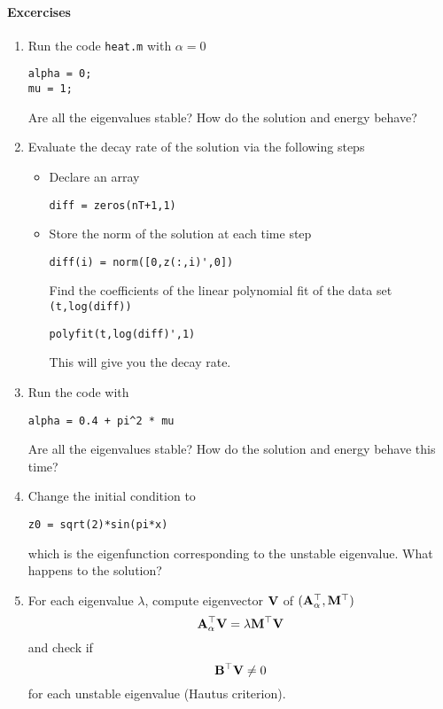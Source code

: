 \documentclass[12pt]{article}
\begin{document}
\paragraph{Excercises}
\begin{enumerate}
\item Run the code {\tt heat.m} with $\alpha =0$
\begin{lstlisting}
alpha = 0; 
mu = 1;
\end{lstlisting}
Are all the eigenvalues stable? How do the solution and energy behave?
\item Evaluate the decay rate of the solution via the following steps
\begin{itemize}

\item Declare an array 
\begin{lstlisting}
diff = zeros(nT+1,1)
\end{lstlisting}

\item Store the norm of the solution at each time step 
\begin{lstlisting}
diff(i) = norm([0,z(:,i)',0])
\end{lstlisting}
Find the coefficients of the linear polynomial fit of the data set {\tt (t,log(diff))}
\begin{lstlisting}
polyfit(t,log(diff)',1)
\end{lstlisting}
This will give you the decay rate.
\end{itemize}      
\item Run the code with
\begin{lstlisting}
alpha = 0.4 + pi^2 * mu
\end{lstlisting}
Are all the eigenvalues stable? How do the solution and energy behave this time?

\item Change the initial condition to
\begin{lstlisting}
z0 = sqrt(2)*sin(pi*x)
\end{lstlisting}
which is the eigenfunction corresponding to the unstable eigenvalue. What happens to the solution?

\item For each eigenvalue $\lambda$, compute eigenvector ${\mathbf V}$ of $({\mathbf A}_\alpha^\top,{\mathbf M}^\top)$
\[
 {\mathbf A}_\alpha^\top {\mathbf V} = \lambda {\mathbf M}^\top {\mathbf V}
\]
and check if 
\[
 {\mathbf B}^\top {\mathbf V} \ne 0
\]
for each unstable eigenvalue (Hautus criterion).
\end{enumerate}

\end{document}
